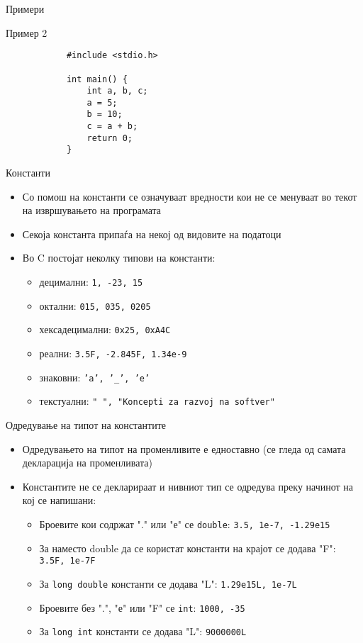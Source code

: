 \begin{frame}[fragile]{Примери}
	\begin{exampleblock}{Пример 2}
		\begin{lstlisting}
			#include <stdio.h>

			int main() {
			    int a, b, c;
			    a = 5;
			    b = 10;
			    c = a + b;
			    return 0;
			}
		\end{lstlisting}
	\end{exampleblock}
\end{frame}

\begin{frame}{Константи}
\begin{itemize}
\item Со помош на константи се означуваат вредности кои не се менуваат во текот на извршувањето на програмата
\item Секоја константа припаѓа на некој од видовите на податоци
\item Во C постојат неколку типови на константи:
\begin{itemize}
\item децимални: \texttt{1, -23, 15}
\item октални: \texttt{015, 035, 0205}
\item хексадецимални: \texttt{0x25, 0xA4C}
\item реални: \texttt{3.5F, -2.845F, 1.34e-9}
\item знаковни: \texttt{'a', '\_', 'e'}
\item текстуални: \texttt{" ", "Koncepti za razvoj na softver"}
\end{itemize}
\end{itemize}
\end{frame}

\begin{frame}{Одредување на типот на константите}
\begin{itemize}
\item Одредувањето на типот на променливите е едноставно (се гледа од самата декларација на променливата)
\item Константите не се декларираат и нивниот тип се одредува преку начинот на кој се напишани:
\begin{itemize}
\item Броевите кои содржат "." или "е" се {\color{blue}\texttt{double}}: \texttt{3.5, 1е-7, -1.29е15}
\item За наместо double да се користат {} константи на крајот се додава "F": \texttt{3.5F, 1e-7F}
\item За {\color{blue}\texttt{long double}} константи се додава "L": \texttt{1.29е15L, 1e-7L}
\item Броевите без ".", "е" или "F" се {\color{blue}\texttt{int}}: \texttt{1000, -35}
\item За {\color{blue}\texttt{long int}} константи се додава "L": \texttt{9000000L}
\end{itemize}
\end{itemize}
\end{frame}

